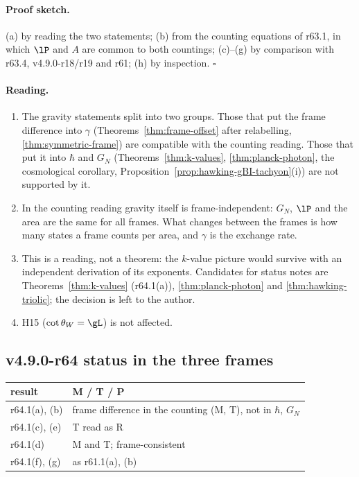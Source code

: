 \paragraph{Proof sketch.}
(a) by reading the two statements; (b) from the counting equations of r63.1, in which \(\lP\) and \(A\) are common to both countings; (c)--(g) by comparison with r63.4,
v4.9.0-r18/r19 and r61; (h) by inspection.  \(\square\)

\paragraph{Reading.}
\begin{enumerate}[leftmargin=2em]
\item The gravity statements split into two groups.  Those that put the frame difference into \(\gamma\) (Theorems~\ref{thm:frame-offset} after relabelling,
\ref{thm:symmetric-frame}) are compatible with the counting reading.  Those that put it into \(\hbar\) and \(G_N\) (Theorems~\ref{thm:k-values}, \ref{thm:planck-photon}, the
cosmological corollary, Proposition~\ref{prop:hawking-gBI-tachyon}(i)) are not supported by it.
\item In the counting reading gravity itself is frame-independent: \(G_N\), \(\lP\) and the area are the same for all frames.  What changes between the frames is how many
states a frame counts per area, and \(\gamma\) is the exchange rate.
\item This is a reading, not a theorem: the \(k\)-value picture would survive with an independent derivation of its exponents.  Candidates for status notes are
Theorems~\ref{thm:k-values} (r64.1(a)), \ref{thm:planck-photon} and \ref{thm:hawking-triolic}; the decision is left to the author.
\item H15 (\(\cot\theta_W=\gL\)) is not affected.
\end{enumerate}

\subsection*{v4.9.0-r64 status in the three frames}
\label{subsec:v490-r64-frames}

\begin{center}
\small
\begin{tabular}{@{}>{\raggedright\arraybackslash}p{}>{\raggedright\arraybackslash}p{}@{}}
\toprule
result & M / T / P\\
\midrule
r64.1(a), (b) & frame difference in the counting (M, T), not in \(\hbar\), \(G_N\)\\
r64.1(c), (e) & T read as R\\
r64.1(d) & M and T; frame-consistent\\
r64.1(f), (g) & as r61.1(a), (b)\\
\bottomrule
\end{tabular}
\end{center}


